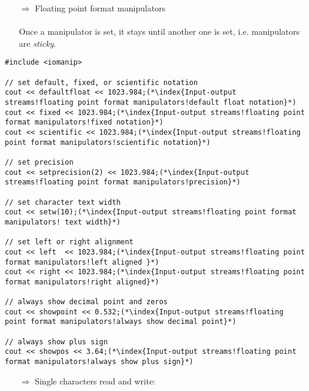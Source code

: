 \documentclass[10pt]{article}
\begin{document}
\begin{enumerate}
\item[$\Rightarrow$] Floating point format manipulators\\ \\ Once a  manipulator is set, it stays until another one is set, i.e. manipulators are \emph{sticky}.
\end{enumerate}
\begin{lstlisting}
#include <iomanip>

// set default, fixed, or scientific notation
cout << defaultfloat << 1023.984;(*\index{Input-output streams!floating point format manipulators!default float notation}*)
cout << fixed << 1023.984;(*\index{Input-output streams!floating point format manipulators!fixed notation}*)
cout << scientific << 1023.984;(*\index{Input-output streams!floating point format manipulators!scientific notation}*)

// set precision
cout << setprecision(2) << 1023.984;(*\index{Input-output streams!floating point format manipulators!precision}*)

// set character text width
cout << setw(10);(*\index{Input-output streams!floating point format manipulators! text width}*)

// set left or right alignment
cout << left  << 1023.984;(*\index{Input-output streams!floating point format manipulators!left aligned }*)
cout << right << 1023.984;(*\index{Input-output streams!floating point format manipulators!right aligned}*)

// always show decimal point and zeros
cout << showpoint << 0.532;(*\index{Input-output streams!floating point format manipulators!always show decimal point}*)

// always show plus sign
cout << showpos << 3.64;(*\index{Input-output streams!floating point format manipulators!always show plus sign}*)
\end{lstlisting}
\begin{enumerate}
\item[$\Rightarrow$] Single characters read and write:
\end{enumerate}
\end{document}
